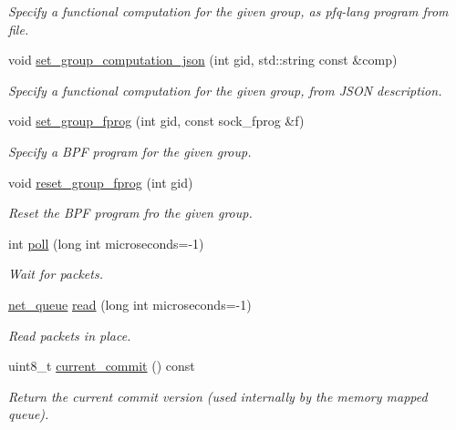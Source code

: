 \begin{DoxyCompactItemize}
\begin{DoxyCompactList}\small\item\em Specify a functional computation for the given group, as pfq-\/lang program from file. \end{DoxyCompactList}\item 
void \hyperlink{classpfq_1_1socket_ac60650eec56374ac4be3c69b43255b85}{set\+\_\+group\+\_\+computation\+\_\+json} (int gid, std\+::string const \&comp)
\begin{DoxyCompactList}\small\item\em Specify a functional computation for the given group, from J\+S\+ON description. \end{DoxyCompactList}\item 
void \hyperlink{classpfq_1_1socket_ad618894910a12a08eaed3d8668db25af}{set\+\_\+group\+\_\+fprog} (int gid, const sock\+\_\+fprog \&f)
\begin{DoxyCompactList}\small\item\em Specify a B\+PF program for the given group. \end{DoxyCompactList}\item 
void \hyperlink{classpfq_1_1socket_a2327e71a6f94e54efb0da5ec36b1c620}{reset\+\_\+group\+\_\+fprog} (int gid)
\begin{DoxyCompactList}\small\item\em Reset the B\+PF program fro the given group. \end{DoxyCompactList}\item 
int \hyperlink{classpfq_1_1socket_ad8ce551ea07f39317bb383ab88d66344}{poll} (long int microseconds=-\/1)
\begin{DoxyCompactList}\small\item\em Wait for packets. \end{DoxyCompactList}\item 
\hyperlink{classpfq_1_1net__queue}{net\+\_\+queue} \hyperlink{classpfq_1_1socket_a6004249d3abfe8a2329b44ba797d1909}{read} (long int microseconds=-\/1)
\begin{DoxyCompactList}\small\item\em Read packets in place. \end{DoxyCompactList}\item 
uint8\+\_\+t \hyperlink{classpfq_1_1socket_aba44de6422e3e10b65474e7f3999ebd0}{current\+\_\+commit} () const 
\begin{DoxyCompactList}\small\item\em Return the current commit version (used internally by the memory mapped queue). \end{DoxyCompactList}\item 

\end{DoxyCompactItemize}
